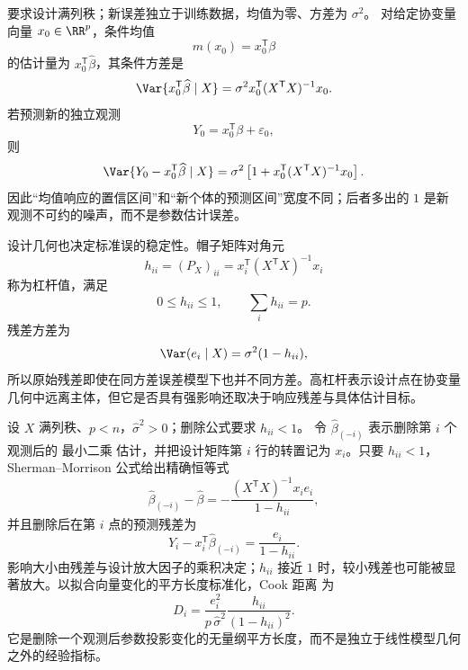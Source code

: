 \begin{proposition}[均值估计与新观测预测的方差]
要求设计满列秩；新误差独立于训练数据，均值为零、方差为 $\sigma^2$。
对给定协变量向量 $x_0\in\RR^p$，条件均值
\[
 m(x_0)=x_0^{\mathsf T}\beta
\]
的估计量为 $x_0^{\mathsf T}\widehat\beta$，其条件方差是
\[
 \Var\{x_0^{\mathsf T}\widehat\beta\mid X\}
 =\sigma^2x_0^{\mathsf T}(X^{\mathsf T}X)^{-1}x_0.
\]
若预测新的独立观测
\[
 Y_0=x_0^{\mathsf T}\beta+\varepsilon_0,
\]
则
\[
 \Var\{Y_0-x_0^{\mathsf T}\widehat\beta\mid X\}
 =\sigma^2
 \left[1+x_0^{\mathsf T}(X^{\mathsf T}X)^{-1}x_0\right].
\]
因此“均值响应的置信区间”和“新个体的预测区间”宽度不同；后者多出的 $1$ 是新观测不可约的噪声，而不是参数估计误差。
\end{proposition}

\begin{proposition}[杠杆值与残差方差]
设计几何也决定标准误的稳定性。帽子矩阵对角元
\[
 h_{ii}=(P_X)_{ii}
 =x_i^{\mathsf T}(X^{\mathsf T}X)^{-1}x_i
\]
称为杠杆值，满足
\[
 0\le h_{ii}\le1,
 \qquad
 \sum_i h_{ii}=p.
\]
残差方差为
\[
 \Var(e_i\mid X)=\sigma^2(1-h_{ii}),
\]
所以原始残差即使在同方差误差模型下也并不同方差。高杠杆表示设计点在协变量几何中远离主体，但它是否具有强影响还取决于响应残差与具体估计目标。
\end{proposition}

\begin{proposition}
设 $X$ 满列秩、$p<n$，$\widehat\sigma^2>0$；删除公式要求 $h_{ii}<1$。
令 $\widehat\beta_{(-i)}$ 表示删除第 $i$ 个观测后的 最小二乘 估计，并把设计矩阵第 $i$ 行的转置记为 $x_i$。只要 $h_{ii}<1$，Sherman--Morrison 公式给出精确恒等式
\begin{equation}\label{eq:math-stat-leave-one-out-beta}
 \widehat\beta_{(-i)}-\widehat\beta
 =-\frac{(X^{\mathsf T}X)^{-1}x_i e_i}{1-h_{ii}},
\end{equation}
并且删除后在第 $i$ 点的预测残差为
\[
 Y_i-x_i^{\mathsf T}\widehat\beta_{(-i)}
 =\frac{e_i}{1-h_{ii}}.
\]
影响大小由残差与设计放大因子的乘积决定；$h_{ii}$ 接近 $1$ 时，较小残差也可能被显著放大。以拟合向量变化的平方长度标准化，Cook 距离 为
\begin{equation}\label{eq:math-stat-cook-distance}
 D_i
 =\frac{e_i^2}{p\,\widehat\sigma^2}
 \frac{h_{ii}}{(1-h_{ii})^2}.
\end{equation}
它是删除一个观测后参数投影变化的无量纲平方长度，而不是独立于线性模型几何之外的经验指标。
\end{proposition}

